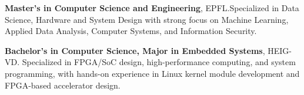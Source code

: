 %
%
%

\vspace*{-5mm}

\begin{scholarship}
    {\textbf{Master's in Computer Science and Engineering}, EPFL.\newline Specialized in Data Science, Hardware and System Design with strong focus on Machine Learning, Applied Data Analysis, Computer Systems, and Information Security.}

    {\textbf{Bachelor's in Computer Science, Major in Embedded Systems}, HEIG-VD.\newline 
    Specialized in FPGA/SoC design, high-performance computing, and system programming, with hands-on experience in Linux kernel module development and FPGA-based accelerator design.}
	
\end{scholarship}